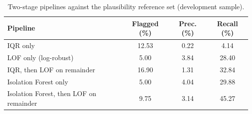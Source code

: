 \begin{table}[!t]
\caption{Two-stage pipelines against the plausibility reference set (development sample).}
\label{tab:ext_twostage}
\centering
\setlength{\tabcolsep}{3pt}
\footnotesize
\begin{tabular}{lccc}
\hline
Pipeline & Flagged (\%) & Prec. (\%) & Recall (\%) \\
\hline
IQR only & 12.53 & 0.22 & 4.14 \\
LOF only (log-robust) & 5.00 & 3.84 & 28.40 \\
IQR, then LOF on remainder & 16.90 & 1.31 & 32.84 \\
Isolation Forest only & 5.00 & 4.04 & 29.88 \\
Isolation Forest, then LOF on remainder & 9.75 & 3.14 & 45.27 \\
\hline
\end{tabular}
\end{table}